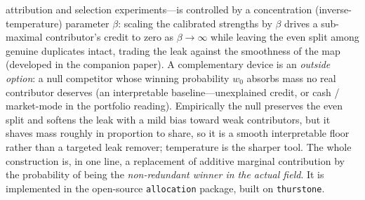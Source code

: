 \documentclass[11pt]{article}
\begin{document}
attribution and selection experiments---is controlled by a concentration
(inverse-temperature) parameter $\beta$: scaling the calibrated strengths by $\beta$
drives a sub-maximal contributor's credit to zero as $\beta\to\infty$ while leaving
the even split among genuine duplicates intact, trading the leak against the
smoothness of the map (developed in the companion paper). A complementary device is
an \emph{outside option}: a null competitor whose winning probability $w_0$ absorbs
mass no real contributor deserves (an interpretable baseline---unexplained credit, or
cash / market-mode in the portfolio reading). Empirically the null preserves the even
split and softens the leak with a mild bias toward weak contributors, but it shaves
mass roughly in proportion to share, so it is a smooth interpretable floor rather than
a targeted leak remover; temperature is the sharper tool. The whole construction is,
in one line, a replacement of additive marginal contribution by the probability of
being the \emph{non-redundant winner in the actual field}. It is implemented in the
open-source \texttt{allocation} package, built on \texttt{thurstone}.

\printbibliography
\end{document}
